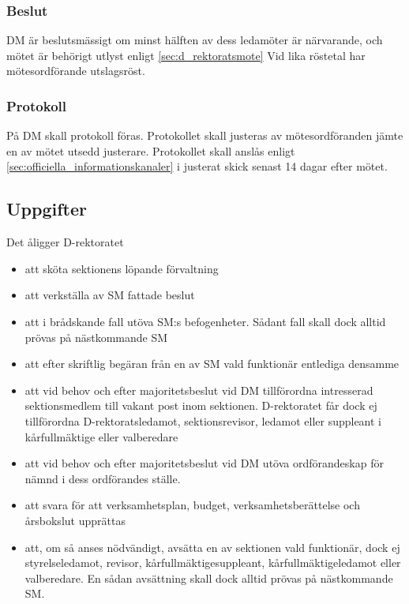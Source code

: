 \documentclass{dgovdoc}
\begin{document}
\subsubsection{Beslut}

DM är beslutsmässigt om minst hälften av dess ledamöter är närvarande, och
mötet är behörigt utlyst enligt \ref{sec:d_rektoratsmote} Vid lika röstetal har
mötesordförande utslagsröst.

\subsubsection{Protokoll}

På DM skall protokoll föras. Protokollet skall justeras av mötesordföranden
jämte en av mötet utsedd justerare. Protokollet skall anslås enligt
\ref{sec:officiella_informationskanaler} i justerat skick senast 14 dagar efter
mötet.

\subsection{Uppgifter}

Det åligger D-rektoratet

\begin{itemize}
  \item att sköta sektionens löpande förvaltning
  \item att verkställa av SM fattade beslut
  \item att i brådskande fall utöva SM:s befogenheter. Sådant fall skall dock
    alltid prövas på nästkommande SM
  \item att efter skriftlig begäran från en av SM vald funktionär entlediga
    densamme
  \item att vid behov och efter majoritetsbeslut vid DM tillförordna
    intresserad sektionsmedlem till vakant post inom sektionen. D-rektoratet
    får dock ej tillförordna D-rektoratsledamot, sektionsrevisor, ledamot eller
    suppleant i kårfullmäktige eller valberedare
  \item att vid behov och efter majoritetsbeslut vid DM utöva ordförandeskap
    för nämnd i dess ordförandes ställe.
  \item att svara för att verksamhetsplan, budget, verksamhetsberättelse och
    årsbokslut upprättas
  \item att, om så anses nödvändigt, avsätta en av sektionen vald funktionär,
    dock ej styrelseledamot, revisor, kårfullmäktigesuppleant,
    kårfullmäktigeledamot eller valberedare. En sådan avsättning skall dock
    alltid prövas på nästkommande SM.
\end{itemize}
\end{document}

